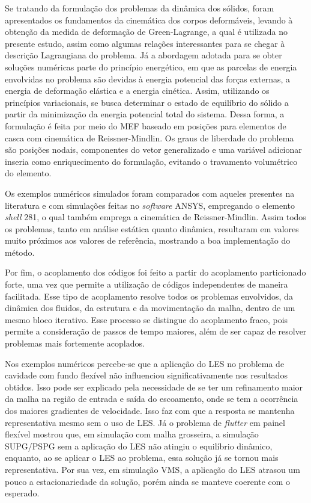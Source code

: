 Se tratando da formulação dos problemas da dinâmica dos sólidos, foram apresentados os fundamentos da cinemática dos corpos deformáveis, levando à obtenção da medida de deformação de Green-Lagrange, a qual é utilizada no presente estudo, assim como algumas relações interessantes para se chegar à descrição Lagrangiana do problema. Já a abordagem adotada para se obter soluções numéricas parte do princípio energético, em que as parcelas de energia envolvidas no problema são devidas à energia potencial das forças externas, a energia de deformação elástica e a energia cinética. Assim, utilizando os princípios variacionais, se busca determinar o estado de equilíbrio do sólido a partir da minimização da energia potencial total do sistema. Dessa forma, a formulação é feita por meio do MEF baseado em posições para elementos de casca com cinemática de Reissner-Mindlin. Os graus de liberdade do problema são posições nodais, componentes do vetor generalizado e uma variável adicionar inseria como enriquecimento do formulação, evitando o travamento volumétrico do elemento.

Os exemplos numéricos simulados foram comparados com aqueles presentes na literatura e com simulações feitas no \textit{software} ANSYS, empregando o elemento \textit{shell} 281, o qual também emprega a cinemática de Reissner-Mindlin. Assim todos os problemas, tanto em análise estática quanto dinâmica, resultaram em valores muito próximos aos valores de referência, mostrando a boa implementação do método.

Por fim, o acoplamento dos códigos foi feito a partir do acoplamento particionado forte, uma vez que permite a utilização de códigos independentes de maneira facilitada. Esse tipo de acoplamento resolve todos os problemas envolvidos, da dinâmica dos fluidos, da estrutura e da movimentação da malha, dentro de um mesmo bloco iterativo. Esse processo se distingue do acoplamento fraco, pois permite a consideração de passos de tempo maiores, além de ser capaz de resolver problemas mais fortemente acoplados.

Nos exemplos numéricos percebe-se que a aplicação do LES no problema de cavidade com fundo flexível não influenciou significativamente nos resultados obtidos. Isso pode ser explicado pela necessidade de se ter um refinamento maior da malha na região de entrada e saída do escoamento, onde se tem a ocorrência dos maiores gradientes de velocidade. Isso faz com que a resposta se mantenha representativa mesmo sem o uso de LES. Já o problema de \textit{flutter} em painel flexível mostrou que, em simulação com malha grosseira, a simulação SUPG/PSPG sem a aplicação do LES não atingiu o equilíbrio dinâmico, enquanto, ao se aplicar o LES ao problema, essa solução já se tornou mais representativa. Por sua vez, em simulação VMS, a aplicação do LES atrasou um pouco a estacionariedade da solução, porém ainda se manteve coerente com o esperado.

